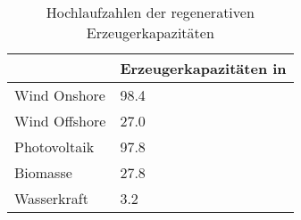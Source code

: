 {
\renewcommand{\arraystretch}{1.2}%
\begin{table}[H]
	\begin{center}
		\caption{Hochlaufzahlen der regenerativen Erzeugerkapazitäten}
		\begin{tabu} to 0.6\textwidth {X[1] X[2, r]}
			\hline
			              & Erzeugerkapazitäten in \si{\gw} \\ \hline
			Wind Onshore  & \num{98.4}                      \\
			Wind Offshore & \num{27.0}                      \\
			Photovoltaik  & \num{97.8}                      \\
			Biomasse      & \num{27.8}                      \\
			Wasserkraft   & \num{3.2}                       \\ \hline
		\end{tabu}
		\label{tab:EE-RampUp}
	\end{center}
	\vspace{-3mm}%
\end{table}
}
